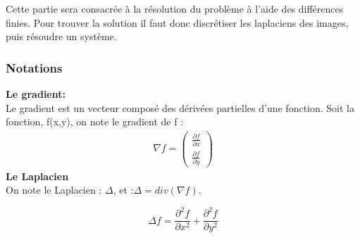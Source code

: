 Cette partie sera consacrée à la résolution du problème à l'aide des différences finies. Pour trouver la solution il faut donc discrétiser les laplaciens des images, puis résoudre un système.
 \subsubsection{Notations}
\textbf{Le gradient: }\\
Le gradient est un vecteur composé des dérivées partielles d'une fonction. Soit la fonction, f(x,y), on note le gradient de f : 
\begin{equation*}
\begin{aligned}
\nabla f = \begin{pmatrix}
\frac{\partial f}{\partial x}\\
\frac{\partial f}{\partial y}
\end{pmatrix}
\end{aligned}
\end{equation*}
\textbf{Le Laplacien}\\
On note le Laplacien : $\Delta$, et :$\Delta = div(\nabla f)$.
\begin{center}
\begin{equation*}
    \Delta f  = \frac{\partial^2 f}{\partial x^2}+ \frac{\partial ^2 f}{\partial y^2}
\end{equation*}
\end{center}

